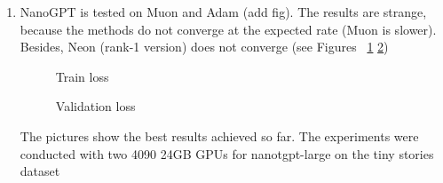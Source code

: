 \documentclass[]{scrartcl}
\begin{document}
\begin{enumerate}
    \item NanoGPT is tested on Muon and Adam (add fig). The results are strange, because the methods do not converge at the expected rate (Muon is slower). Besides, Neon (rank-1 version) does not converge (see Figures ~\ref{fig:train_loss} \ref{fig:val_loss})
    \begin{figure}[h!]
        \caption{Train loss}
        \label{fig:train_loss}
    \end{figure}
    \begin{figure}[h!]
        \caption{Validation loss}
        \label{fig:val_loss}
    \end{figure} 


    The pictures show the best results achieved so far. The experiments were conducted with two 4090 24GB GPUs for nanotgpt-large on the tiny stories dataset
    

\end{enumerate}
\end{document}
